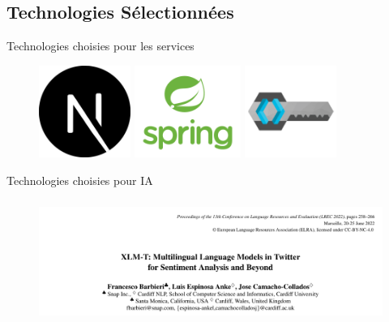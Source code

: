 \subsection{Technologies Sélectionnées}
\begin{frame}{Technologies choisies pour les services}
    \begin{figure}[H]
        \centering
        \begin{minipage}{0.32\textwidth}
            \centering
            \includegraphics[height=3cm]{assets/images/next.png}
        \end{minipage}%
        \hspace{0.03\textwidth}
        \begin{minipage}{0.32\textwidth}
            \centering
            \includegraphics[height=3cm]{assets/images/spring.png}
        \end{minipage}%
        \hspace{0.03\textwidth}
        \begin{minipage}{0.32\textwidth}
            \centering
            \includegraphics[height=3cm]{assets/images/keycloak.png}
        \end{minipage}

    \end{figure}
\end{frame}



\begin{frame}{Technologies choisies pour IA}
    \begin{figure}[H]
        \centering

       
            \includegraphics[height=4cm]{assets/images/ai-name.png}
    
      
    \end{figure}
\end{frame}

